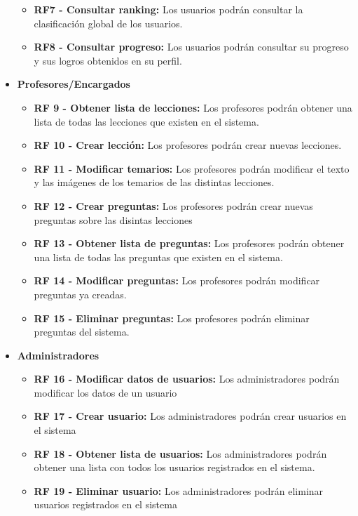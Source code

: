 \begin{itemize}
\begin{itemize}
              \item \textbf{RF7 - Consultar ranking: }Los usuarios podrán consultar la clasificación global de los usuarios.
              \item \textbf{RF8 - Consultar progreso: } Los usuarios podrán consultar su progreso y sus logros obtenidos en su perfil.
          \end{itemize}
    \item \textbf{Profesores/Encargados}
          \begin{itemize}
              \item \textbf{RF 9 - Obtener lista de lecciones: } Los profesores podrán obtener una lista de todas las lecciones que existen en el sistema.
              \item \textbf{RF 10 - Crear lección: }Los profesores podrán crear nuevas lecciones.
              \item \textbf{RF 11 - Modificar temarios: }Los profesores podrán modificar el texto y las imágenes de los temarios de las distintas lecciones.
              \item \textbf{RF 12 - Crear preguntas: } Los profesores podrán crear nuevas preguntas sobre las disintas lecciones
              \item \textbf{RF 13 - Obtener lista de preguntas: } Los profesores podrán obtener una lista de todas las preguntas que existen en el sistema.
              \item \textbf{RF 14 - Modificar preguntas: } Los profesores podrán modificar preguntas ya creadas.
              \item \textbf{RF 15 - Eliminar preguntas: } Los profesores podrán eliminar preguntas del sistema.
          \end{itemize}
    \item \textbf{Administradores}
          \begin{itemize}
              \item \textbf{RF 16 - Modificar datos de usuarios: }Los administradores podrán modificar los datos de un usuario
              \item \textbf{RF 17 - Crear usuario: }Los administradores podrán crear usuarios en el sistema
              \item \textbf{RF 18 - Obtener lista de usuarios: } Los administradores podrán obtener una lista con todos los usuarios registrados en el sistema.
              \item \textbf{RF 19 - Eliminar usuario: }Los administradores podrán eliminar usuarios registrados en el sistema
          \end{itemize}
\end{itemize}

